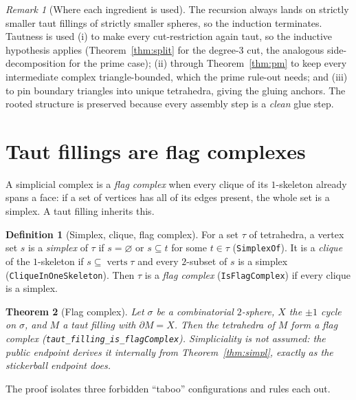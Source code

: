 \documentclass[11pt]{article}
\theoremstyle{plain}
\newtheorem{theorem}{Theorem}[section]
\theoremstyle{definition}
\newtheorem{definition}[theorem]{Definition}
\theoremstyle{remark}
\newtheorem*{remark}{Remark}
\newcommand{\bd}{\partial}
\newcommand{\code}[1]{\texttt{#1}}
\begin{document}
\begin{remark}[Where each ingredient is used]
The recursion always lands on strictly smaller taut fillings of strictly smaller spheres,
so the induction terminates. Tautness is used (i) to make every cut-restriction again taut,
so the inductive hypothesis applies (Theorem~\ref{thm:split} for the degree-$3$ cut, the
analogous side-decomposition for the prime case); (ii) through
Theorem~\ref{thm:pm} to keep every intermediate complex triangle-bounded, which the prime
rule-out needs; and (iii) to pin boundary triangles into unique tetrahedra, giving the
gluing anchors. The rooted structure is preserved because every assembly step is a
\emph{clean} glue step.
\end{remark}

\section{Taut fillings are flag complexes}\label{sec:flag}

A simplicial complex is a \emph{flag complex} when every clique of its $1$-skeleton already
spans a face: if a set of vertices has all of its edges present, the whole set is a simplex. A
taut filling inherits this.

\begin{definition}[Simplex, clique, flag complex]\label{def:flag}
For a set $\tau$ of tetrahedra, a vertex set $s$ is a \emph{simplex} of $\tau$ if $s=\varnothing$
or $s\subseteq t$ for some $t\in\tau$ (\code{SimplexOf}). It is a \emph{clique} of the
$1$-skeleton if $s\subseteq\operatorname{verts}\tau$ and every $2$-subset of $s$ is a simplex
(\code{CliqueInOneSkeleton}). Then $\tau$ is a \emph{flag complex} (\code{IsFlagComplex}) if
every clique is a simplex.
\end{definition}

\begin{theorem}[Flag complex]\label{thm:flag}
Let $\sigma$ be a combinatorial $2$-sphere, $X$ the $\pm1$ cycle on $\sigma$, and $M$ a taut
filling with $\bd M=X$. Then the tetrahedra of $M$ form a flag complex
(\code{taut\_filling\_is\_flagComplex}). \emph{Simpliciality is not assumed}: the public endpoint
derives it internally from Theorem~\ref{thm:simpl}, exactly as the stickerball endpoint does.
\end{theorem}

The proof isolates three forbidden ``taboo'' configurations and rules each out.
\end{document}

